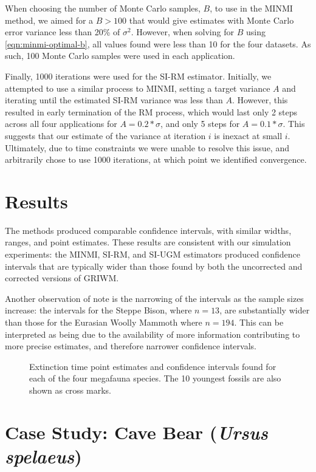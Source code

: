 When choosing the number of Monte Carlo samples, $B$, to use in the MINMI method, we aimed for a $B > 100$ that would give estimates with Monte Carlo error variance less than 20\% of $\sigma^2$. However, when solving for $B$ using \autoref{eqn:minmi-optimal-b}, all values found were less than 10 for the four datasets. As such, 100 Monte Carlo samples were used in each application.

Finally, 1000 iterations were used for the SI-RM estimator. Initially, we attempted to use a similar process to MINMI, setting a target variance $A$ and iterating until the estimated SI-RM variance was less than $A$. However, this resulted in early termination of the RM process, which would last only 2 steps across all four applications for $A  = 0.2*\sigma$, and only 5 steps for $A = 0.1*\sigma$. This suggests that our estimate of the variance at iteration $i$ is inexact at small $i$. Ultimately, due to time constraints we were unable to resolve this issue, and arbitrarily chose to use 1000 iterations, at which point we identified convergence.

\section{Results}

The methods produced comparable confidence intervals, with similar widths, ranges, and point estimates. These results are consistent with our simulation experiments: the MINMI, SI-RM, and SI-UGM estimators produced confidence intervals that are typically wider than those found by both the uncorrected and corrected versions of GRIWM.

Another observation of note is the narrowing of the intervals as the sample sizes increase: the intervals for the Steppe Bison, where $n = 13$, are substantially wider than those for the Eurasian Woolly Mammoth where $n = 194$. This can be interpreted as being due to the availability of more information contributing to more precise estimates, and therefore narrower confidence intervals.
\begin{figure}[ht]
    \centering
    
    \caption{Extinction time point estimates and confidence intervals found for each of the four megafauna species. The 10 youngest fossils are also shown as cross marks.}
    \label{fig:applications-confidence-intervals}
\end{figure}
\clearpage
\section{Case Study: Cave Bear (\textit{Ursus spelaeus})}

